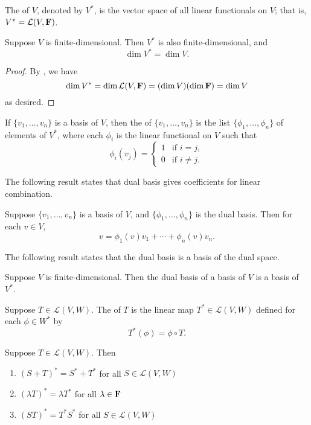 \begin{definition}
The  of $V$, denoted by $V^*$, is the vector space of all linear functionals on $V$; that is, $V^*=\mathcal{L}(V,\mathbf F)$.
\end{definition}

\begin{lemma}
Suppose $V$ is finite-dimensional. Then $V^*$ is also finite-dimensional, and
\[\dim V^*=\dim V.\]
\end{lemma}

\begin{proof}
By , we have
\[\dim V^*=\dim\mathcal{L}(V,\mathbf F)=(\dim V)(\dim\mathbf F)=\dim V\]
as desired.
\end{proof}

\begin{definition}
If $\{v_1,\dots,v_n\}$ is a basis of $V$, then the  of $\{v_1,\dots,v_n\}$ is the list $\{\phi_1,\dots,\phi_n\}$ of elements of $V^*$, where each $\phi_i$ is the linear functional on $V$ such that
\[\phi_i(v_j)=\begin{cases}
1&\text{if }i=j,\\
0&\text{if }i\neq j.
\end{cases}\]
\end{definition}

The following result states that dual basis gives coefficients for linear combination.

\begin{proposition}
Suppose $\{v_1,\dots,v_n\}$ is a basis of $V$, and $\{\phi_1,\dots,\phi_n\}$ is the dual basis. Then for each $v\in V$,
\[v=\phi_1(v)v_1+\cdots+\phi_n(v)v_n.\]
\end{proposition}

The following result states that the dual basis is a basis of the dual space.

\begin{proposition}
Suppose $V$ is finite-dimensional. Then the dual basis of a basis of $V$ is a basis of $V^*$.
\end{proposition}

\begin{definition}
Suppose $T\in\mathcal{L}(V,W)$. The  of $T$ is the linear map $T^*\in\mathcal{L}(V,W)$ defined for each $\phi\in W^*$ by
\[T^*(\phi)=\phi\circ T.\]
\end{definition}

\begin{proposition}
Suppose $T\in\mathcal{L}(V,W)$. Then
\begin{enumerate}[label=(\arabic*)]
\item $(S+T)^*=S^*+T^*$ for all $S\in\mathcal{L}(V,W)$
\item $(\lambda T)^*=\lambda T^*$ for all $\lambda\in\mathbf F$
\item $(ST)^*=T^* S^*$ for all $S\in\mathcal{L}(V,W)$
\end{enumerate}
\end{proposition}

